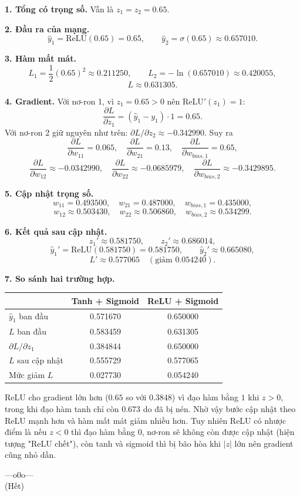\documentclass[a4paper,12pt]{article}
\begin{document}
\textbf{1. Tổng có trọng số.} Vẫn là $z_1 = z_2 = 0.65$.

\textbf{2. Đầu ra của mạng.}
\[ \hat{y}_1 = \mathrm{ReLU}(0.65) = 0.65, \qquad
   \hat{y}_2 = \sigma(0.65) \approx 0.657010. \]

\textbf{3. Hàm mất mát.}
\[ L_1 = \frac{1}{2}(0.65)^2 \approx 0.211250, \qquad
   L_2 = -\ln(0.657010) \approx 0.420055, \]
\[ L \approx 0.631305. \]

\textbf{4. Gradient.}
Với nơ-ron 1, vì $z_1 = 0.65 > 0$ nên $\mathrm{ReLU}'(z_1) = 1$:
\[ \frac{\partial L}{\partial z_1} = (\hat{y}_1 - y_1)\cdot 1 = 0.65. \]
Với nơ-ron 2 giữ nguyên như trên: $\partial L/\partial z_2 \approx -0.342990$. Suy ra
\[ \frac{\partial L}{\partial w_{11}} = 0.065, \quad
   \frac{\partial L}{\partial w_{21}} = 0.13, \quad
   \frac{\partial L}{\partial w_{bias,1}} = 0.65, \]
\[ \frac{\partial L}{\partial w_{12}} \approx -0.0342990, \quad
   \frac{\partial L}{\partial w_{22}} \approx -0.0685979, \quad
   \frac{\partial L}{\partial w_{bias,2}} \approx -0.3429895. \]

\textbf{5. Cập nhật trọng số.}
\[ w_{11} = 0.493500, \quad w_{21} = 0.487000, \quad w_{bias,1} = 0.435000, \]
\[ w_{12} \approx 0.503430, \quad w_{22} \approx 0.506860, \quad w_{bias,2} \approx 0.534299. \]

\textbf{6. Kết quả sau cập nhật.}
\[ z_1' \approx 0.581750, \qquad z_2' \approx 0.686014, \]
\[ \hat{y}_1' = \mathrm{ReLU}(0.581750) = 0.581750, \qquad
   \hat{y}_2' \approx 0.665080, \]
\[ L' \approx 0.577065 \quad (\text{giảm } 0.054240). \]

\textbf{7. So sánh hai trường hợp.}
\begin{center}
\begin{tabular}{|l|c|c|}
\hline
 & Tanh + Sigmoid & ReLU + Sigmoid \\
\hline
$\hat{y}_1$ ban đầu & 0.571670 & 0.650000 \\
$L$ ban đầu & 0.583459 & 0.631305 \\
$\partial L/\partial z_1$ & 0.384844 & 0.650000 \\
$L$ sau cập nhật & 0.555729 & 0.577065 \\
Mức giảm $L$ & 0.027730 & 0.054240 \\
\hline
\end{tabular}
\end{center}

ReLU cho gradient lớn hơn ($0.65$ so với $0.3848$) vì đạo hàm bằng $1$ khi $z > 0$, trong khi
đạo hàm tanh chỉ còn $0.673$ do đã bị nén. Nhờ vậy bước cập nhật theo ReLU mạnh hơn và hàm
mất mát giảm nhiều hơn. Tuy nhiên ReLU có nhược điểm là nếu $z < 0$ thì đạo hàm bằng $0$, nơ-ron
sẽ không còn được cập nhật (hiện tượng "ReLU chết"), còn tanh và sigmoid thì bị bão hòa khi
$|z|$ lớn nên gradient cũng nhỏ dần.

\begin{center}
---o0o--- \\[0.3cm]
(Hết)
\end{center}
\end{document}
